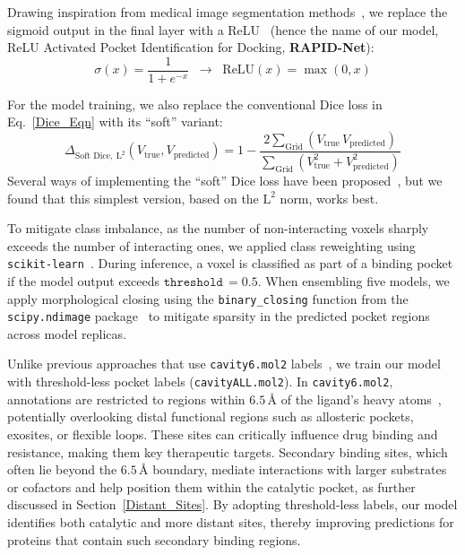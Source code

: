 \documentclass[10pt,conference]{IEEEtran}
\begin{document}
Drawing inspiration from medical image segmentation methods~\cite{gros2021softseg,wang2023dice1,milletari2016vnet}, we replace the sigmoid output in the final layer with a ReLU~\cite{nair2010relu} (hence the name of our model, ReLU Activated Pocket Identification for Docking, \textbf{RAPID-Net}):
\begin{equation}
\sigma\left(x\right) = \frac{1}{1 + e^{-x}} 
\;\;\rightarrow\;\;
\text{ReLU}\left(x\right) = \max\left(0, x\right)
\end{equation}

For the model training, we also replace the conventional Dice loss in Eq.~\ref{Dice_Eqn} with its ``soft'' variant:
\begin{equation}
\Delta_{\text{Soft Dice}, \ \text{L}^2}(V_{\text{true}}, V_{\text{predicted}}) 
= 1
- \frac{2 \sum_{\text{Grid}} \left(V_{\text{true}} \, V_{\text{predicted}}\right)}
       {\sum_{\text{Grid}} \left(V_{\text{true}}^2 
        +  V_{\text{predicted}}^2\right)}
\label{Soft_Dice_Eqn}
\end{equation}
Several ways of implementing the ``soft'' Dice loss have been proposed~\cite{wang2023dice1,milletari2016vnet}, but we found that this simplest version, based on the $\text{L}^2$ norm, works best.


To mitigate class imbalance, as the number of non-interacting voxels sharply exceeds the number of interacting ones, we applied class reweighting using \texttt{scikit-learn}~\cite{scikit-learn}. During inference, a voxel is classified as part of a binding pocket if the model output exceeds $\texttt{threshold}\,=0.5$. When ensembling five models, we apply morphological closing using the \texttt{binary\_closing} function from the \texttt{scipy.ndimage} package~\cite{2020SciPy-NMeth} to mitigate sparsity in the predicted pocket regions across model replicas.



Unlike previous approaches that use \texttt{cavity6.mol2} labels~\cite{kandel2021puresnet,stepniewska2020improving}, we train our model with threshold-less pocket labels (\texttt{cavityALL.mol2}). In \texttt{cavity6.mol2}, annotations are restricted to regions within $6.5\,\text{\AA}$ of the ligand’s heavy atoms~\cite{desaphy2015scpdb}, potentially overlooking distal functional regions such as allosteric pockets, exosites, or flexible loops. These sites can critically influence drug binding and resistance, making them key therapeutic targets. Secondary binding sites, which often lie beyond the $6.5\,\text{\AA}$ boundary, mediate interactions with larger substrates or cofactors and help position them within the catalytic pocket, as further discussed in Section~\ref{Distant_Sites}. By adopting threshold-less labels, our model identifies both catalytic and more distant sites, thereby improving predictions for proteins that contain such secondary binding regions.
\end{document}
